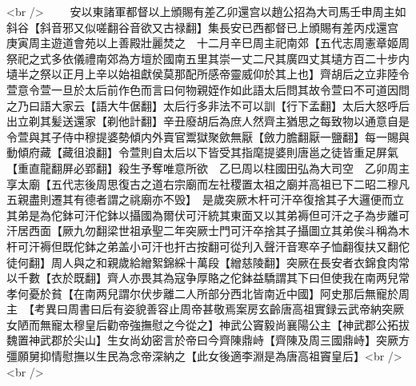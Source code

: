 <br />
　　安以東諸軍都督以上頒賜有差乙卯還宫以趙公招為大司馬壬申周主如斜谷【斜音邪又似嗟翻谷音欲又古禄翻】集長安已西都督已上頒賜有差丙戍還宫　庚寅周主遊道會苑以上善殿壯麗焚之　十二月辛巳周主祀南郊【五代志周憲章姬周祭祀之式多依儀禮南郊為方壇於國南五里其崇一丈二尺其廣四丈其壝方百二十步内壝半之祭以正月上辛以始祖獻侯莫那配所感帝靈威仰於其上也】齊胡后之立非陸令萱意令萱一旦於太后前作色而言曰何物親姪作如此語太后問其故令萱曰不可道因問之乃曰語大家云【語大牛倨翻】太后行多非法不可以訓【行下孟翻】太后大怒呼后出立剃其髪送還家【剃他計翻】辛丑廢胡后為庶人然齊主猶思之每致物以通意自是令萱與其子侍中穆提婆勢傾内外賣官鬻獄聚歛無厭【斂力膽翻厭一鹽翻】每一賜與動傾府藏【藏徂浪翻】令萱則自太后以下皆受其指麾提婆則唐邕之徒皆重足屏氣【重直龍翻屏必郢翻】殺生予奪唯意所欲　乙巳周以柱國田弘為大司空　乙卯周主享太廟【五代志後周思復古之道右宗廟而左社稷置太祖之廟并高祖已下二昭二穆凡五親盡則遷其有德者謂之祧廟亦不毁】　是歲突厥木杆可汗卒復捨其子大邏便而立其弟是為佗鉢可汗佗鉢以攝國為爾伏可汗統其東面又以其弟褥但可汗之子為步離可汗居西面【厥九勿翻梁世祖承聖二年突厥士門可汗卒捨其子攝圖立其弟俟斗稱為木杆可汗褥但既佗鉢之弟盖小可汗也扞古按翻可從刋入聲汗音寒卒子恤翻復扶又翻佗徒何翻】周人與之和親歲給繒絮錦綵十萬段【繒慈陵翻】突厥在長安者衣錦食肉常以千數【衣於既翻】齊人亦畏其為寇争厚賂之佗鉢益驕謂其下曰但使我在南两兒常孝何憂於貧【在南两兒謂尔伏步離二人所部分西北皆南近中國】阿史那后無寵於周主　【考異曰周書曰后有姿貌善容止周帝甚敬焉案房玄齡唐高祖實録云武帝納突厥女陋而無寵太穆皇后勸帝強撫慰之今從之】神武公竇毅尚襄陽公主【神武郡公拓拔魏置神武郡於尖山】生女尚幼密言於帝曰今齊陳鼎峙【齊陳及周三國鼎峙】突厥方彊願舅抑情慰撫以生民為念帝深納之【此女後適李淵是為唐高祖竇皇后】<br />
<br />
